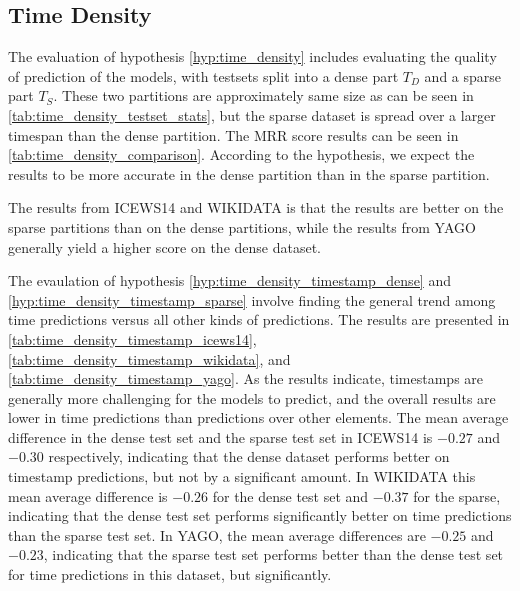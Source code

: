 \subsection{Time Density}
\label{sec:time_density_experiment}







The evaluation of hypothesis \autoref{hyp:time_density} includes evaluating the quality of prediction of the models, with testsets split into a dense part $T_D$ and a sparse part $T_S$. These two partitions are approximately same size as can be seen in \autoref{tab:time_density_testset_stats}, but the sparse dataset is spread over a larger timespan than the dense partition. The MRR score results can be seen in \autoref{tab:time_density_comparison}. According to the hypothesis, we expect the results to be more accurate in the dense partition than in the sparse partition.

The results from ICEWS14 and WIKIDATA is that the results are better on the sparse partitions than on the dense partitions, while the results from YAGO generally yield a higher score on the dense dataset.

The evaulation of hypothesis \autoref{hyp:time_density_timestamp_dense} and \autoref{hyp:time_density_timestamp_sparse} involve finding the general trend among time predictions versus all other kinds of predictions. The results are presented in \autoref{tab:time_density_timestamp_icews14}, \autoref{tab:time_density_timestamp_wikidata}, and \autoref{tab:time_density_timestamp_yago}.
As the results indicate, timestamps are generally more challenging for the models to predict, and the overall results are lower in time predictions than predictions over other elements.
The mean average difference in the dense test set and the sparse test set in ICEWS14 is $-0.27$ and $-0.30$ respectively, indicating that the dense dataset performs better on timestamp predictions, but not by a significant amount.
In WIKIDATA this mean average difference is $-0.26$ for the dense test set and $-0.37$ for the sparse, indicating that the dense test set performs significantly better on time predictions than the sparse test set.
In YAGO, the mean average differences are $-0.25$ and $-0.23$, indicating that the sparse test set performs better than the dense test set for time predictions in this dataset, but significantly.

